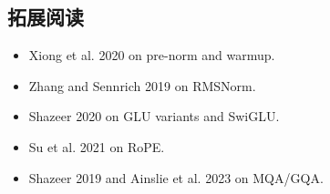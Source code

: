 \documentclass[a4paper]{article}
\begin{document}
\subsection{拓展阅读}
\begin{itemize}
    \item Xiong et al. 2020 on pre-norm and warmup.
    \item Zhang and Sennrich 2019 on RMSNorm.
    \item Shazeer 2020 on GLU variants and SwiGLU.
    \item Su et al. 2021 on RoPE.
    \item Shazeer 2019 and Ainslie et al. 2023 on MQA/GQA.
\end{itemize}
\end{document}
